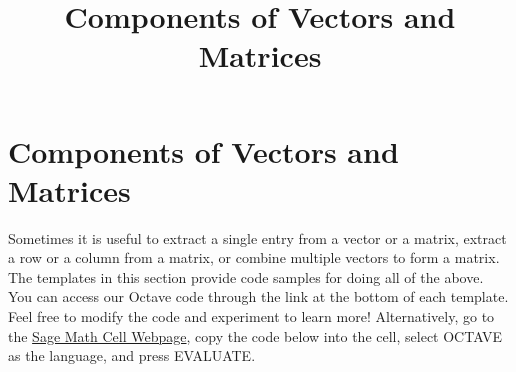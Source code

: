 \documentclass{ximera}
\title{Components of Vectors and Matrices} \license{CC BY-NC-SA 4.0}
\begin{document}
\begin{abstract}
\end{abstract}
\maketitle
\section*{Components of Vectors and Matrices}

Sometimes it is useful to extract a single entry from a vector or a matrix, extract a row or a column from a matrix, or combine multiple vectors to form a matrix.  The templates in this section provide code samples for doing all of the above. You can access our Octave code through the link at the bottom of each template.  Feel free to modify the code and experiment to learn more!  Alternatively, go to the \href{https://sagecell.sagemath.org/}{Sage Math Cell Webpage}, copy the code below into the cell, select OCTAVE as the language, and press EVALUATE.  
\end{document}
